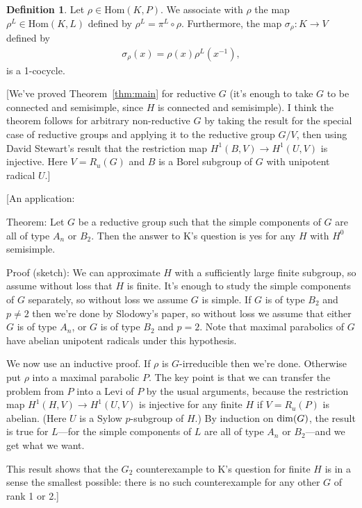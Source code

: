 \documentclass[12pt]{amsart}
\newcommand\ra{\rightarrow}
\numberwithin{equation}{section}
\theoremstyle{definition}
\newtheorem{defn}[equation]{Definition}
\theoremstyle{remark}
\theoremstyle{remark}
\begin{document}
\begin{defn} Let $\rho \in \mathrm{Hom}(K, P)$. We associate with $\rho$ the map $\rho^L \in \mathrm{Hom}(K, L)$ defined by
$\rho^L = \pi^L \circ \rho.$
Furthermore, the map $\sigma_\rho: K \rightarrow V$ defined by
\begin{align*}\label{rho:alpha}
\sigma_\rho(x) = \rho(x)\rho^L(x^{-1}),
\end{align*}
is a 1-cocycle.
\end{defn}

[We've proved Theorem~\ref{thm:main} for reductive $G$ (it's enough to take $G$ to be connected and semisimple, since $H$ is connected and semisimple).  I think the theorem follows for arbitrary non-reductive $G$ by taking the result for the special case of reductive groups and applying it to the reductive group $G/V$, then using David Stewart's result that the restriction map $H^1(B,V)\ra H^1(U,V)$ is injective.  Here $V= R_u(G)$ and $B$ is a Borel subgroup of $G$ with unipotent radical $U$.]

[An application:

Theorem: Let $G$ be a reductive group such that the simple components of $G$ are all of type $A_n$ or $B_2$.  Then the answer to K's question is yes for any $H$ with $H^0$ semisimple.

Proof (sketch): We can approximate $H$ with a sufficiently large finite subgroup, so assume without loss that $H$ is finite.  It's enough to study the simple components of $G$ separately, so without loss we assume $G$ is simple.  If $G$ is of type $B_2$ and $p\neq 2$ then we're done by Slodowy's paper, so without loss we assume that either $G$ is of type $A_n$, or $G$ is of type $B_2$ and $p= 2$.  Note that maximal parabolics of $G$ have abelian unipotent radicals under this hypothesis.

We now use an inductive proof.  If $\rho$ is $G$-irreducible then we're done.  Otherwise put $\rho$ into a maximal parabolic $P$.  The key point is that we can transfer the problem from $P$ into a Levi of $P$ by the usual arguments, because the restriction map $H^1(H,V)\ra H^1(U,V)$ is injective for any finite $H$ if $V= R_u(P)$ is abelian.  (Here $U$ is a Sylow $p$-subgroup of $H$.)  By induction on ${\rm dim}(G)$, the result is true for $L$---for the simple components of $L$ are all of type $A_n$ or $B_2$---and we get what we want.

This result shows that the $G_2$ counterexample to K's question for finite $H$ is in a sense the smallest possible: there is no such counterexample for any other $G$ of rank 1 or 2.]
\end{document}
